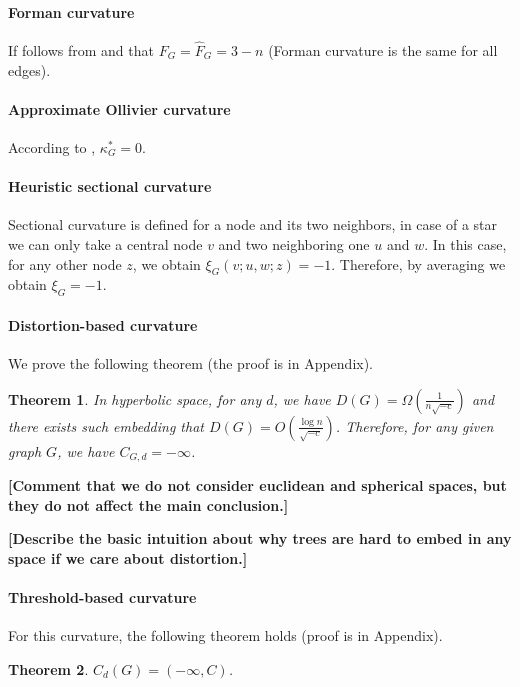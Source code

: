 \documentclass{article} %
\newtheorem{theorem}{Theorem}[section]
\begin{document}
\paragraph{Forman curvature}
If follows from  and  that
$F_G = \hat F_G = 3-n$ (Forman curvature is the same for all edges).

\paragraph{Approximate Ollivier curvature} According to , $\kappa_G^* = 0$.

\paragraph{Heuristic sectional curvature}

Sectional curvature is defined for a node and its two neighbors, in case of a star we can only take a central node $v$ and two neighboring one $u$ and $w$. In this case, for any other node $z$, we obtain $\xi_G(v;u,w;z) = -1$. Therefore, by averaging we obtain $\xi_G = -1$.

\paragraph{Distortion-based curvature} 
We prove the following theorem (the proof is in Appendix).

\begin{theorem}\label{thm:star_distortion}
In hyperbolic space, for any $d$, we have $D(G) = \Omega\left(\frac{1}{n\sqrt{-c}}\right)$ and there exists such embedding that $D(G) = O\left(\frac{\log n}{\sqrt{-c}}\right)$. Therefore, for any given graph $G$, we have $C_{G,d} = -\infty$.
\end{theorem}

\textbf{[Comment that we do not consider euclidean and spherical spaces, but they do not affect the main conclusion.]}

\textbf{[Describe the basic intuition about why trees are hard to embed in any space if we care about distortion.]}

\paragraph{Threshold-based curvature} 
For this curvature, the following theorem holds (proof is in Appendix).

\begin{theorem}\label{thm:star_threshold}
$C_d(G) = (-\infty, C)$.
\end{theorem}
\end{document}
